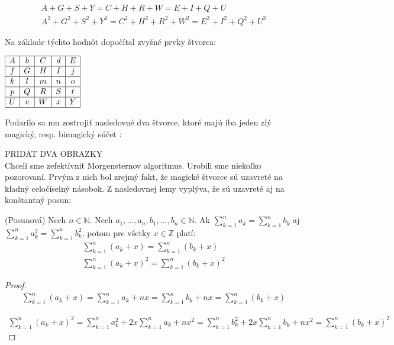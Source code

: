 \begin{gather}
A+G+S+Y = C+H+R+W = E+I+Q+U \\
A^2+G^2+S^2+Y^2 = C^2+H^2+R^2+W^2 = E^2+I^2+Q^2+U^2
\end{gather}

Na základe týchto hodnôt dopočítal zvyšné prvky štvorca:

\begin{center}
$\begin{array}{ |c|c|c|c|c| }
\hline
A & b & C & d & E \\ 
\hline
f & G & H & I & j  \\ 
\hline
k & l & m & n & o \\ 
\hline
p & Q & R & S & t \\ 
\hline
U & v & W & x & Y \\
\hline
\end{array}$
\end{center}

Podarilo sa mu zostrojiť nasledovné dva štvorce, ktoré majú iba jeden zlý magický, resp. bimagický súčet \cite{multimagie}:

PRIDAT DVA OBRAZKY \\

Chceli sme zefektívniť Morgensternov algoritmus. Urobili sme niekoľko pozorovaní. Prvým z nich bol zrejmý fakt, že magické štvorce sú uzavreté na kladný celočíselný násobok. Z nasledovnej lemy vyplýva, že sú uzavreté aj na konštantný posun:

\begin{lemma} (Posunová) Nech $n \in \mathbb{N}$. Nech $a_1, ... , a_n, b_1, ... , b_n \in \mathbb{N}$. Ak $\sum_{k=1}^{n} a_k = \sum_{k=1}^{n} b_k$ aj $\sum_{k=1}^{n} a^2_k = \sum_{k=1}^{n} b^2_k$, potom pre všetky $x \in \mathbb{Z}$ platí:
\begin{gather}
\sum_{k=1}^{n} (a_k + x) = \sum_{k=1}^{n} (b_k + x) \\
\sum_{k=1}^{n} (a_k + x)^2 = \sum_{k=1}^{n} (b_k + x)^2
\end{gather}
\end{lemma}
 
\begin{proof}
\begin{gather}
\sum_{k=1}^{n} (a_k + x) = \sum_{k=1}^{n} a_k + nx = \sum_{k=1}^{n} b_k + nx = \sum_{k=1}^{n} (b_k + x)
\end{gather}

\begin{gather}
\sum_{k=1}^{n} (a_k + x)^2 = \sum_{k=1}^{n} a^2_k + 2x \sum_{k=1}^{n} a_k + nx^2 = \sum_{k=1}^{n} b^2_k + 2x \sum_{k=1}^{n} b_k + nx^2 = \sum_{k=1}^{n} (b_k + x)^2
\end{gather}
\end{proof}

